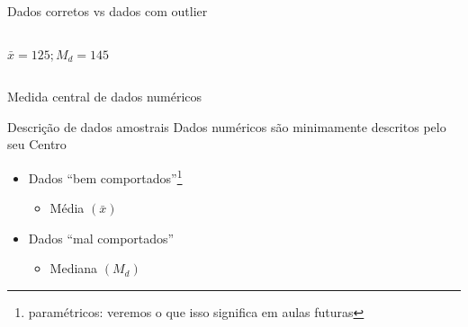 \documentclass{beamer}
\begin{document}
\begin{frame}{\scriptsize Dados corretos vs dados com outlier}
\begin{columns}
\begin{column}{5cm}
\begin{center}
        \scriptsize
        \bigskip
        $\bar{x} = 125 ; M_d= 145$
      \end{center}
    \end{column}
  \end{columns}
\end{frame}

\begin{frame}{\scriptsize Medida central de dados numéricos}
  \begin{block}{Descrição de dados amostrais}
    \scriptsize
    Dados numéricos são minimamente descritos pelo seu Centro

    \bigskip
    \begin{itemize}
      \footnotesize
    \item Dados ``bem comportados''\footnote{\scriptsize paramétricos: veremos o que isso significa em aulas futuras}
      \begin{itemize}
        \scriptsize
      \item Média $\left( \bar{x} \right)$
      \end{itemize}
      \bigskip
    \item Dados ``mal comportados''
      \begin{itemize}
        \scriptsize
      \item Mediana $\left( M_d \right)$
      \end{itemize}
    \end{itemize}
  \end{block}
\end{frame}

\end{document}

